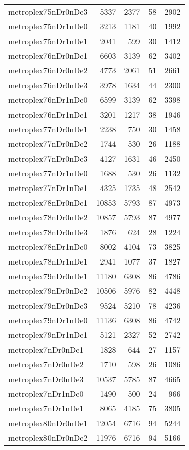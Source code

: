 \documentclass[../../../thesis.tex]{subfiles}
\begin{document}
\begin{longtable}{lrrrr}
metroplex75nDr0nDe3 & 5337 & 2377 & 58 & 2902 \\
metroplex75nDr1nDe0 & 3213 & 1181 & 40 & 1992 \\
metroplex75nDr1nDe1 & 2041 & 599 & 30 & 1412 \\
metroplex76nDr0nDe1 & 6603 & 3139 & 62 & 3402 \\
metroplex76nDr0nDe2 & 4773 & 2061 & 51 & 2661 \\
metroplex76nDr0nDe3 & 3978 & 1634 & 44 & 2300 \\
metroplex76nDr1nDe0 & 6599 & 3139 & 62 & 3398 \\
metroplex76nDr1nDe1 & 3201 & 1217 & 38 & 1946 \\
metroplex77nDr0nDe1 & 2238 & 750 & 30 & 1458 \\
metroplex77nDr0nDe2 & 1744 & 530 & 26 & 1188 \\
metroplex77nDr0nDe3 & 4127 & 1631 & 46 & 2450 \\
metroplex77nDr1nDe0 & 1688 & 530 & 26 & 1132 \\
metroplex77nDr1nDe1 & 4325 & 1735 & 48 & 2542 \\
metroplex78nDr0nDe1 & 10853 & 5793 & 87 & 4973 \\
metroplex78nDr0nDe2 & 10857 & 5793 & 87 & 4977 \\
metroplex78nDr0nDe3 & 1876 & 624 & 28 & 1224 \\
metroplex78nDr1nDe0 & 8002 & 4104 & 73 & 3825 \\
metroplex78nDr1nDe1 & 2941 & 1077 & 37 & 1827 \\
metroplex79nDr0nDe1 & 11180 & 6308 & 86 & 4786 \\
metroplex79nDr0nDe2 & 10506 & 5976 & 82 & 4448 \\
metroplex79nDr0nDe3 & 9524 & 5210 & 78 & 4236 \\
metroplex79nDr1nDe0 & 11136 & 6308 & 86 & 4742 \\
metroplex79nDr1nDe1 & 5121 & 2327 & 52 & 2742 \\
metroplex7nDr0nDe1 & 1828 & 644 & 27 & 1157 \\
metroplex7nDr0nDe2 & 1710 & 598 & 26 & 1086 \\
metroplex7nDr0nDe3 & 10537 & 5785 & 87 & 4665 \\
metroplex7nDr1nDe0 & 1490 & 500 & 24 & 966 \\
metroplex7nDr1nDe1 & 8065 & 4185 & 75 & 3805 \\
metroplex80nDr0nDe1 & 12054 & 6716 & 94 & 5244 \\
metroplex80nDr0nDe2 & 11976 & 6716 & 94 & 5166 \\

\end{longtable}
\end{document}

